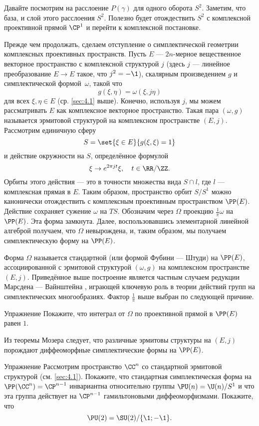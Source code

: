 Давайте посмотрим на расслоение $P(\gamma)$ для одного оборота $S^2$.
Заметим, что база, и слой этого расслоения $S^2$.
Полезно будет отождествить $S^2$ с комплексной проективной прямой $\CP^1$ и перейти к комплексной постановке.

Прежде чем продолжать, сделаем отступление о симплектической геометрии комплексных проективных пространств.
Пусть $E$ --- $2n$-мерное вещественное векторное пространство с комплексной структурой $j$
(здесь $j$ --- линейное преобразование $E\to E$ такое, что $j^2 = -\1$),
скалярным произведением $g$ и симплектической формой~$\omega$, такой что
\[g(\xi, \eta ) = \omega(\xi, j\eta)\]
для всех $\xi, \eta \in E$ (ср. \ref{sec:4.1} выше).
Конечно, используя $j$, мы можем рассматривать $E$ как комплексное векторное пространство.
Такая пара $(\omega, g)$ называется эрмитовой структурой на комплексном пространстве $(E, j)$.
Рассмотрим единичную сферу
\[S = \set{\xi \in E}{g(\xi, \xi) = 1}\]
и действие окружности на $S$, определённое формулой 
\[\xi \to e^{2\pi jt} \xi,\quad t \in \RR/\ZZ.\]
Орбиты этого действия --- это в точности множества вида $S \cap l$, где $l$ --- комплексная прямая в $E$.
Таким образом, пространство орбит $S/S^1$ можно канонически отождествить с комплексным проективным пространством $\PP(E)$.
Действие сохраняет сужение $\omega$ на $T S$.
Обозначим через $\Omega$ проекцию $\tfrac1\pi \omega$ на $\PP(E)$.
Эта форма замкнута.
Далее, воспользовавшись элементарной линейной алгеброй получаем, что $\Omega$ невырождена, и, таким образом, мы получаем симплектическую форму на $\PP(E)$.

Форма $\Omega$ называется стандартной (или формой Фубини --- Штуди) на $\PP(E)$, ассоциированной с эрмитовой структурой $(\omega, g)$ на комплексном пространстве $(E, j)$.
Приведённое выше построение является частным случаем редукции Марсдена --- Вайнштейна \cite{MS}, играющей ключевую роль в теории действий групп на симплектических многообразиях.
Фактор $\tfrac1\pi$ выше выбран по следующей причине.

\begin{thm}{Упражнение}\label{9.2.A}
Покажите, что интеграл от $\Omega$ по проективной прямой в $\PP(E)$ равен $1$.
\end{thm}

Из теоремы Мозера \cite{MS} следует, что различные эрмитовы структуры на $(E, j)$ порождают диффеоморфные симплектические формы на $\PP(E)$.

\begin{thm}{Упражнение}\label{9.2.B}
Рассмотрим пространство $\CC^n$ со стандартной эрмитовой структурой (см. \ref{sec:4.1}).
Покажите, что стандартная симплектическая форма на $\PP(\CC^n ) = \CP^{n-1}$ инвариантна относительно группы $\PU (n) = \U (n)/S^1$ и что эта группа действует на $\CP^{n-1}$ гамильтоновыми диффеоморфизмами.
Покажите, что 
\[\PU (2) = \SU (2)/\{\1; -\1\}.\]

\end{thm}

